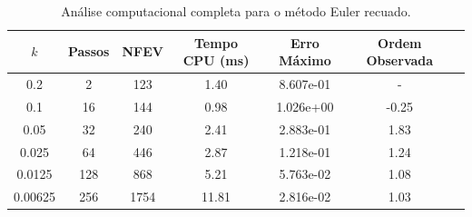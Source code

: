 \begin{table}[H]
    \centering
    \begin{tabular}{ccccccc}
        \hline
        $k$ & Passos & NFEV & Tempo CPU (ms) & Erro Máximo & Ordem Observada \\
        \hline
        0.2 & 2 & 123 & 1.40  & 8.607e-01 & - \\
        0.1 & 16 & 144 & 0.98  & 1.026e+00 & -0.25 \\
        0.05 & 32 & 240 & 2.41  & 2.883e-01 & 1.83 \\
        0.025 & 64 & 446 & 2.87  & 1.218e-01 & 1.24 \\
        0.0125 & 128 & 868 & 5.21  & 5.763e-02 & 1.08 \\
        0.00625 & 256 & 1754 & 11.81  & 2.816e-02 & 1.03 \\
        \hline
    \end{tabular}
    \caption{Análise computacional completa para o método Euler recuado.}
    \label{tab:erros_euler_recuado}
\end{table}
